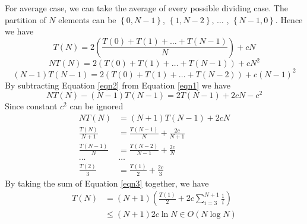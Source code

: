 \begin{exercise}[]
\begin{solution}
  For average case, we can take the average of every possible dividing case. The partition of $N$ elements can be $\left\{0,N-1\right\}$, $\left\{1,N-2\right\}$, $\ldots$ , $\left\{N-1,0\right\}$. Hence we have
  \begin{equation}
      T(N) = 2\left(\frac{T(0)+T(1)+\ldots+T(N-1)}{N}\right) + cN
  \end{equation}
  \begin{equation}
    NT(N) = 2\left({T(0)+T(1)+\ldots+T(N-1)}\right) + cN^2
    \label{eqn1}
  \end{equation}
  \begin{equation}
    (N-1)T(N-1) = 2\left({T(0)+T(1)+\ldots+T(N-2)}\right) + c(N-1)^2
    \label{eqn2}
  \end{equation}
  By subtracting Equation \ref{eqn2} from Equation \ref{eqn1} we have
  \begin{equation}
    NT(N) - (N-1)T(N-1) = 2T(N-1) + 2cN - c^2
  \end{equation}
  Since constant $c^2$ can be ignored
  \begin{equation}
    \begin{aligned}
      NT(N) &= (N+1)T(N-1) +2cN \\
      \frac{T(N)}{N+1} &= \frac{T(N-1)}{N} + \frac{2c}{N+1} \\
      \frac{T(N-1)}{N} &= \frac{T(N-2)}{N-1} + \frac{2c}{N} \\
      \ldots & \ldots \\
      \frac{T(2)}{3} &= \frac{T(1)}{2} + \frac{2c}{3}
    \end{aligned}
    \label{eqn3}
  \end{equation}
  By taking the sum of Equation \ref{eqn3} together, we have
  \begin{equation}
    \begin{aligned}
      T(N) &= (N+1)\left(\frac{T(1)}{2} + 2c \sum_{i=3}^{N+1}\frac{1}{i}\right) \\
      &\le (N+1)2c \ln N \in O(N\log N)
    \end{aligned}
  \end{equation}
  \end{solution}
  \label{ex5}
\end{exercise}



